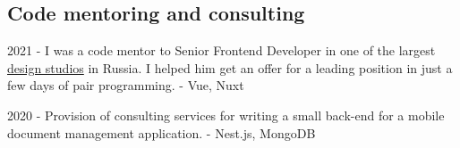 \documentclass{yb}
\begin{document}
\begin{samepage}
\subsection*{Code mentoring and consulting}

2021 - I was a code mentor to Senior Frontend Developer in one of the largest \href{https://pinkman.ru/}{design studios} in Russia. I helped him get an offer for a leading position in just a few days of pair programming.
\newline - Vue, Nuxt

2020 - Provision of consulting services for writing a small back-end for a mobile document management application.
\newline - Nest.js, MongoDB

\end{samepage}
\end{document}
